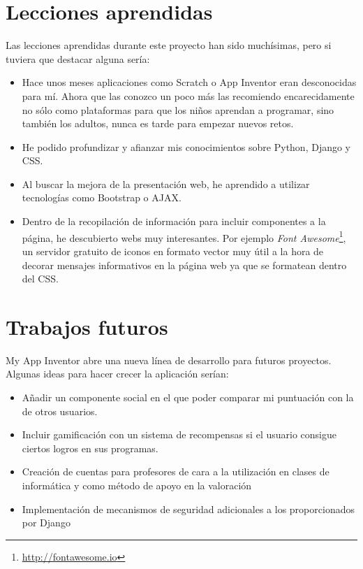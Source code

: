 \documentclass[a4paper, 12pt]{book}
\begin{document}
\section{Lecciones aprendidas}
\label{sec:lecciones_aprendidas}
Las lecciones aprendidas durante este proyecto han sido muchísimas, pero si tuviera que destacar alguna sería:
\begin{itemize}
  \item Hace unos meses aplicaciones como Scratch o App Inventor eran desconocidas para mí. Ahora que las conozco un poco más las recomiendo encarecidamente no sólo como plataformas para que los niños aprendan a programar, sino también los adultos, nunca es tarde para empezar nuevos retos.
  \item He podido profundizar y afianzar mis conocimientos sobre Python, Django y CSS.
  \item Al buscar la mejora de la presentación web, he aprendido a utilizar tecnologías como Bootstrap o AJAX.
  \item Dentro de la recopilación de información para incluir componentes a la página, he descubierto webs muy interesantes. Por ejemplo \textit{Font Awesome}\footnote{\url{http://fontawesome.io}}, un servidor gratuito de iconos en formato vector muy útil a la hora de decorar mensajes informativos en la página web ya que se formatean dentro del CSS. 
\end{itemize}

\section{Trabajos futuros}
\label{sec:trabajos_futuros}

My App Inventor abre una nueva línea de desarrollo para futuros proyectos. Algunas ideas para hacer crecer la aplicación serían:
\begin{itemize}
  \item Añadir un componente social en el que poder comparar mi puntuación con la de otros usuarios.
  \item Incluir gamificación con un sistema de recompensas si el usuario consigue ciertos logros en sus programas. 
  \item Creación de cuentas para profesores de cara a la utilización en clases de informática y como método de apoyo en la valoración
  \item Implementación de mecanismos de seguridad adicionales a los proporcionados por Django 
\end{itemize}
\end{document}
